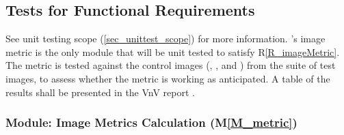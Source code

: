 \documentclass[12pt, titlepage]{article}
\newcommand{\rref}[1]{R\ref{#1}}
\newcommand{\mref}[1]{M\ref{#1}}
\begin{document}
\subsection{Tests for Functional Requirements} \label{sec_func_req_unittest}

See unit testing scope (\ref{sec_unittest_scope}) for more information.
\progname{}'s image metric is the only module that will be unit tested to
satisfy \rref{R_imageMetric}. The metric is tested against the control images
(, , and )
from the suite of test images, to assess whether the metric
is working as anticipated.
A table of the results shall be presented in the VnV report \cite{VnV_report}.

\subsubsection{Module: Image Metrics Calculation (\mref{M_metric})}
\end{document}
